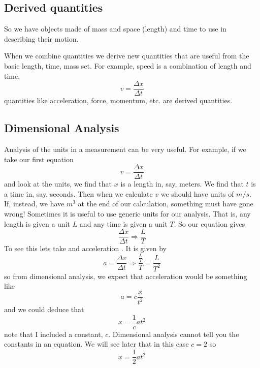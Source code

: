 \documentclass[]{Book}
\begin{document}
\subsection{Derived quantities}

So we have objects made of mass and space (length) and time to use in
describing their motion.

%
When we combine quantities we derive new quantities that are useful from the
basic length, time, mass set. For example, speed is a combination of length
and time.%
\begin{equation}
	v=\frac{\Delta x}{\Delta t}
\end{equation}%
quantities like acceleration, force, momentum, etc. are derived quantities.

\subsection{Dimensional Analysis}

Analysis of the units in a measurement can be very useful. For example, if
we take our first equation%
\begin{equation}
	v=\frac{\Delta x}{\Delta t}
\end{equation}%
and look at the units, we find that $x$ is a length in, say, meters. We find
that $t$ is a time in, say, seconds. Then when we calculate $v$ we should
have units of $\unit{m}/\unit{s}.$ If, instead, we have $\unit{m}^{3}$ at
the end of our calculation, something must have gone wrong! Sometimes it is
useful to use generic units for our analysis. That is, any length is given a
unit $L$ and any time is given a unit $T.$ So our equation gives 
\begin{equation*}
	\frac{\Delta x}{\Delta t}\Rightarrow \frac{L}{T}
\end{equation*}%
To see this lets take and acceleration . It is given by 
\begin{equation*}
	a=\frac{\Delta v}{\Delta t}\Rightarrow \frac{\frac{L}{T}}{T}=\frac{L}{T^{2}}
\end{equation*}%
so from dimensional analysis, we expect that acceleration would be something
like 
\begin{equation*}
	a=c\frac{x}{t^{2}}
\end{equation*}%
and we could deduce that 
\begin{equation*}
	x=\frac{1}{c}at^{2}
\end{equation*}%
note that I included a constant, $c.$ Dimensional analysis cannot tell you
the constants in an equation. We will see later that in this case $c=2$ so 
\begin{equation*}
	x=\frac{1}{2}at^{2}
\end{equation*}
\end{document}
